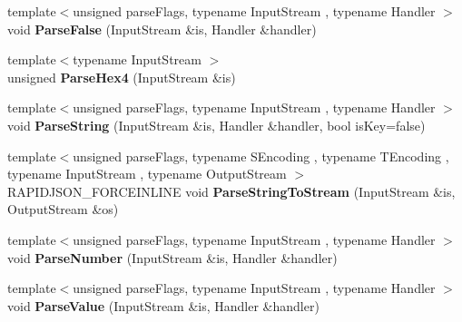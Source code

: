\begin{DoxyCompactItemize}
\item 
{\footnotesize template$<$unsigned parse\+Flags, typename Input\+Stream , typename Handler $>$ }\\void {\bfseries Parse\+False} (Input\+Stream \&is, Handler \&handler)\hypertarget{class_generic_reader_af3af2d4e8efa1b8ef2f0bb281d8f0540}{}\label{class_generic_reader_af3af2d4e8efa1b8ef2f0bb281d8f0540}

\item 
{\footnotesize template$<$typename Input\+Stream $>$ }\\unsigned {\bfseries Parse\+Hex4} (Input\+Stream \&is)\hypertarget{class_generic_reader_a72ded3654cef16bba1b9574b5e3611c8}{}\label{class_generic_reader_a72ded3654cef16bba1b9574b5e3611c8}

\item 
{\footnotesize template$<$unsigned parse\+Flags, typename Input\+Stream , typename Handler $>$ }\\void {\bfseries Parse\+String} (Input\+Stream \&is, Handler \&handler, bool is\+Key=false)\hypertarget{class_generic_reader_ab4d4f63b23b55a72069e2e13eb010cff}{}\label{class_generic_reader_ab4d4f63b23b55a72069e2e13eb010cff}

\item 
{\footnotesize template$<$unsigned parse\+Flags, typename S\+Encoding , typename T\+Encoding , typename Input\+Stream , typename Output\+Stream $>$ }\\R\+A\+P\+I\+D\+J\+S\+O\+N\+\_\+\+F\+O\+R\+C\+E\+I\+N\+L\+I\+NE void {\bfseries Parse\+String\+To\+Stream} (Input\+Stream \&is, Output\+Stream \&os)\hypertarget{class_generic_reader_a8fa22aded7085b3fe5f9d59467318f8a}{}\label{class_generic_reader_a8fa22aded7085b3fe5f9d59467318f8a}

\item 
{\footnotesize template$<$unsigned parse\+Flags, typename Input\+Stream , typename Handler $>$ }\\void {\bfseries Parse\+Number} (Input\+Stream \&is, Handler \&handler)\hypertarget{class_generic_reader_a2447207fde31185e2bb8fbf1250b72e0}{}\label{class_generic_reader_a2447207fde31185e2bb8fbf1250b72e0}

\item 
{\footnotesize template$<$unsigned parse\+Flags, typename Input\+Stream , typename Handler $>$ }\\void {\bfseries Parse\+Value} (Input\+Stream \&is, Handler \&handler)\hypertarget{class_generic_reader_a8c0d07512c0fa447f45c9e5b00dd2d70}{}\label{class_generic_reader_a8c0d07512c0fa447f45c9e5b00dd2d70}


\end{DoxyCompactItemize}
